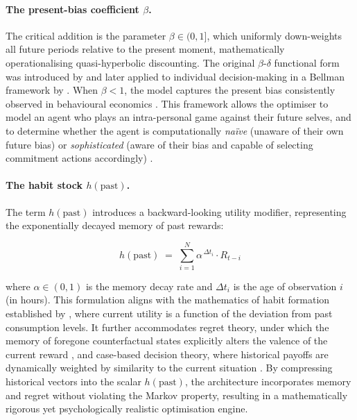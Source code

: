 \documentclass[11pt, a4paper]{article}
\begin{document}
\paragraph{The present-bias coefficient $\beta$.}
The critical addition is the parameter $\beta \in (0,1]$, which uniformly down-weights all
future periods relative to the present moment, mathematically operationalising quasi-hyperbolic
discounting. The original $\beta$-$\delta$ functional form was introduced by
\citet{Phelps1968} and later applied to individual decision-making in a Bellman framework by
\citet{Laibson1997}. When $\beta < 1$, the model captures the present bias consistently
observed in behavioural economics \citep{Frederick2002}. This framework allows the optimiser
to model an agent who plays an intra-personal game against their future selves, and to
determine whether the agent is computationally \textit{na\"ive} (unaware of their own future
bias) or \textit{sophisticated} (aware of their bias and capable of selecting commitment
actions accordingly) \citep{ODonoghue1999}.

\paragraph{The habit stock $h(\text{past})$.}
The term $h(\text{past})$ introduces a backward-looking utility modifier, representing the
exponentially decayed memory of past rewards:

\begin{equation}
  h(\text{past}) \;=\; \sum_{i=1}^{N} \alpha^{\,\Delta t_i} \cdot R_{t-i}
  \label{eq:habit-stock}
\end{equation}

\noindent
where $\alpha \in (0,1)$ is the memory decay rate and $\Delta t_i$ is the age of observation
$i$ (in hours). This formulation aligns with the mathematics of habit formation established by
\citet{Ryder1973}, where current utility is a function of the deviation from past consumption
levels. It further accommodates regret theory, under which the memory of foregone
counterfactual states explicitly alters the valence of the current reward \citep{Loomes1982},
and case-based decision theory, where historical payoffs are dynamically weighted by similarity
to the current situation \citep{Gilboa1995}. By compressing historical vectors into the scalar
$h(\text{past})$, the architecture incorporates memory and regret without violating the
Markov property, resulting in a mathematically rigorous yet psychologically realistic
optimisation engine.
\end{document}
